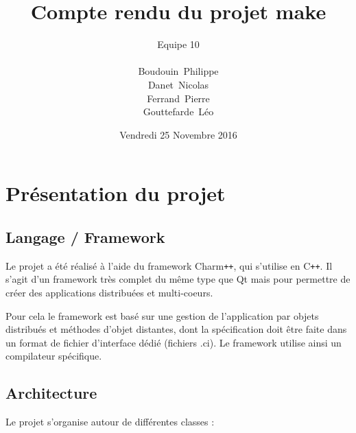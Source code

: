 \documentclass[a4paper, 11pt, titlepage]{article}
\title {{ {\huge Compte rendu du projet make }} }
\author{\Large Equipe 10 \\
\\
    {\sc Boudouin}~Philippe\\
    {\sc Danet}~Nicolas\\
    {\sc Ferrand}~Pierre\\
    {\sc Gouttefarde}~Léo
}
\date{Vendredi 25 Novembre 2016}
\begin{document}
\pagestyle{fancy}
\maketitle

\setcounter{tocdepth}{2}

\tableofcontents
\newpage

\section {Présentation du projet}

\subsection {Langage / Framework}

Le projet a été réalisé à l'aide du framework Charm\texttt{++}, qui s'utilise en C\texttt{++}.
Il s'agit d'un framework très complet du même type que Qt mais pour permettre de créer des applications distribuées et multi-coeurs.

Pour cela le framework est basé sur une gestion de l'application par objets distribués et méthodes d'objet distantes, dont la spécification doit être faite dans un format de fichier d'interface dédié (fichiers .ci).
Le framework utilise ainsi un compilateur spécifique.


\subsection {Architecture}

Le projet s'organise autour de différentes classes :
\end{document}
